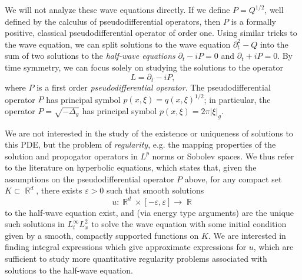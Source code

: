 \documentclass{article}
\theoremstyle{plain}
\theoremstyle{remark}
\theoremstyle{definition}
\DeclareMathOperator{\RR}{\mathbb{R}}
\begin{document}
We will not analyze these wave equations directly. If we define $P = Q^{1/2}$, well defined by the calculus of pseudodifferential operators, then $P$ is a formally positive, classical pseudodifferential operator of order one. Using similar tricks to the wave equation, we can split solutions to the wave equation $\partial_t^2 - Q$ into the sum of two solutions to the \emph{half-wave equations} $\partial_t - i P = 0$ and $\partial_t + i P = 0$. By time symmetry, we can focus solely on studying the solutions to the operator
%
\[ L = \partial_t - i P, \]
%
where $P$ is a first order \emph{pseudodifferential operator}. The pseudodifferential operator $P$ has principal symbol $p(x,\xi) = q(x,\xi)^{1/2}$; in particular, the operator $P = \sqrt{-\Delta_g}$ has principal symbol $p(x,\xi) = 2 \pi |\xi|_g$.

We are not interested in the study of the existence or uniqueness of solutions to this PDE, but the problem of \emph{regularity}, e.g. the mapping properties of the solution and propogator operators in $L^p$ norms or Sobolev spaces. We thus refer to the literature on hyperbolic equations, which states that, given the assumptions on the pseudodifferential operator $P$ above, for any compact set $K \subset \RR^d$, there exists $\varepsilon > 0$ such that smooth solutions
%
\[ u: \RR^d \times [-\varepsilon,\varepsilon] \to \RR \]
%
to the half-wave equation exist, and (via energy type arguments) are the unique such solutions in $L^\infty_t L^2_x$ to solve the wave equation with some initial condition given by a smooth, compactly supported functions on $K$. We are interested in finding integral expressions which give approximate expressions for $u$, which are sufficient to study more quantitative regularity problems associated with solutions to the half-wave equation.

\begin{comment}
For such an operator, we can find a countable, orthogonal basis $\{ e_\lambda : \lambda \geq 0 \}$ of $L^2(M)$, such that $Pe_\lambda = \lambda e_\lambda$, and such that for each $\lambda$, $e_\lambda$ is a smooth function, with $L^2_s$ norm $O_s(\lambda^s)$. The number of elements of this basis with eigenvalue at most $\lambda$ is $O(1 + \lambda^d)$. Given this basis, we can define a family of bounded operators $\{ e^{2 \pi itP} \}$ on $L^2(M)$ by setting $e^{2 \pi it P} e_\lambda = e^{2 \pi it \lambda} e_\lambda$, and then consider a solution operator
%
\[ (Wf)(x,t) = (e^{2 \pi it \lambda} f)(x). \]
%
Using the $L^2_s$ norm properties of the eigenfunctions $\{ e_\lambda \}$, and the fact that for any $f \in C^\infty(M)$,
%
\[ \langle f, e_\lambda \rangle \lesssim_N \lambda^{-N} \quad\text{for all $N > 0$,} \]
%
it is simple to check that $W$ maps $C^\infty(M)$ into $C^\infty_{\text{loc}}(M \times \RR)$, and that for $f \in C^\infty(M)$, the smooth function $u = Wf$ solves the equation $Lu = 0$ with initial conditions $f$. One can also prove the uniqueness of solution solutions, e.g. using energy estimates, but this takes us a little far afield of what we want to talk about in these notes.
\end{comment}
\end{document}
